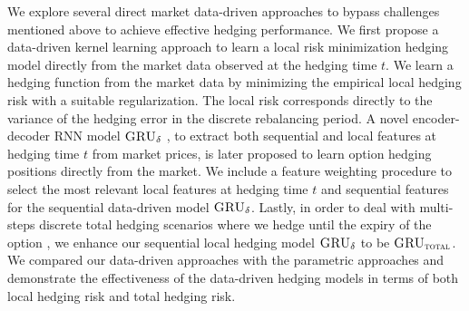 \documentclass[letterpaper,12pt,titlepage,oneside,final]{book}
\numberwithin{equation}{section}
\theoremstyle{definition}
\newcommand{\model}{\textsc{GRU}_\delta}
\newcommand{\modelT}{\textsc{GRU}_{\textsc{total}}}
\begin{document}
We explore several direct market data-driven approaches to bypass  challenges mentioned above to achieve effective hedging performance.
We first propose a  data-driven kernel learning approach \cite{knian2017} to learn a local risk minimization hedging model directly from the market data observed at the hedging time $t$.  We learn a  hedging function from the market data by minimizing  the  empirical local hedging  risk with a suitable regularization. The local risk corresponds directly to the variance of the hedging error in the discrete rebalancing period. A novel encoder-decoder  RNN model $\model$ \cite{knian2019}, to extract both sequential and local features at hedging time $t$ from market prices, is later proposed to learn option hedging positions directly from the market. We include a feature weighting procedure to select the most relevant local features at hedging time $t$ and sequential features for the sequential data-driven model $\model$. Lastly, in order to deal with multi-steps discrete total hedging scenarios where we hedge until the expiry of the option \cite{knian2020}, we enhance our sequential local hedging model $\model$ to be $\modelT$. We compared our data-driven approaches with the parametric approaches and demonstrate the effectiveness of the data-driven hedging models in terms of both local hedging risk and total hedging risk.





\end{document}
